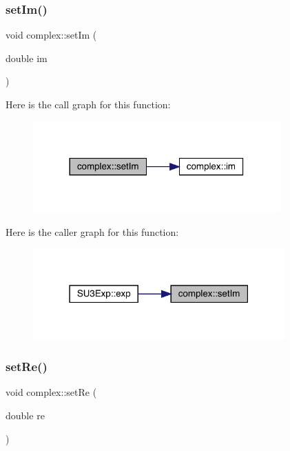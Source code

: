 \subsubsection{\texorpdfstring{setIm()}{setIm()}}
{\footnotesize\ttfamily void complex\+::set\+Im (\begin{DoxyParamCaption}\item[{double}]{im }\end{DoxyParamCaption})\hspace{0.3cm}{\ttfamily [inline]}}

Here is the call graph for this function\+:
\nopagebreak
\begin{figure}[H]
\begin{center}
\leavevmode
\includegraphics[width=269pt]{classcomplex_aa4c37b87b5b9beebddad476b3049394c_cgraph}
\end{center}
\end{figure}
Here is the caller graph for this function\+:
\nopagebreak
\begin{figure}[H]
\begin{center}
\leavevmode
\includegraphics[width=274pt]{classcomplex_aa4c37b87b5b9beebddad476b3049394c_icgraph}
\end{center}
\end{figure}
\mbox{\label{classcomplex_a360f0c3963a8e654ccbc16712294f4d7}} 
\subsubsection{\texorpdfstring{setRe()}{setRe()}}
{\footnotesize\ttfamily void complex\+::set\+Re (\begin{DoxyParamCaption}\item[{double}]{re }\end{DoxyParamCaption})\hspace{0.3cm}{\ttfamily [inline]}}

